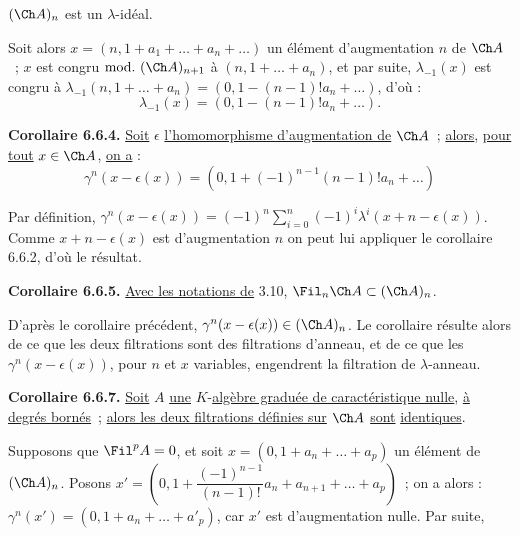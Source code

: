
\((\Ch A)_n\) est un \(\lambda\)-idéal.

Soit alors \(x=(n,1+a_1+\ldots+a_n+\ldots)\) un élément d'augmentation \(n\) de \(\Ch A\)~; \(x\) est congru \(\mathrm{mod.}\ (\Ch A)_{n+1}\) à \((n,1+\ldots+a_n)\), et par suite, \(\lambda_{-1}(x)\) est congru à \(\lambda_{-1}(n,1+\ldots+a_n)=(0,1-(n-1)!a_n+\ldots)\), d'où :
\[
  \lambda_{-1}(x)=(0,1-(n-1)!a_n+\ldots).
\]

\textbf{Corollaire 6.6.4.} \uline{Soit} \(\epsilon\) \uline{l'homomorphisme d'augmentation de} \(\Ch A\)~; \uline{alors}, \uline{pour tout} \(x\in\Ch A\), \uline{on a} :
\[
  \gamma^n(x-\epsilon(x))
  =
  (0,1+(-1)^{n-1}(n-1)!a_n+\ldots)
\]

Par définition, \(\gamma^n(x-\epsilon(x))=(-1)^n\sum_{i=0}^n(-1)^i\lambda^i(x+n-\epsilon(x))\). Comme \(x+n-\epsilon(x)\) est d'augmentation \(n\) on peut lui appliquer le corollaire 6.6.2, d'où le résultat.

\textbf{Corollaire 6.6.5.} \uline{Avec les notations de} 3.10, \(\Fil_n\Ch A\subset(\Ch A)_n\).

D'après le corollaire précédent, \(\gamma^n(x-\epsilon(x))\in(\Ch A)_n\). Le corollaire résulte alors de ce que les deux filtrations sont des filtrations d'anneau, et de ce que les \(\gamma^n(x-\epsilon(x))\), pour \(n\) et \(x\) variables, engendrent la filtration de \(\lambda\)-anneau.

\textbf{Corollaire 6.6.7.} \uline{Soit} \(A\) \uline{une} \(K\)-\uline{algèbre graduée de caractéristique nulle}, \uline{à degrés bornés}~; \uline{alors les deux filtrations définies sur} \(\Ch A\) \uline{sont} \uline{identiques}.

Supposons que \(\Fil^pA=0\), et soit \(x=(0,1+a_n+\ldots+a_p)\) un élément de \((\Ch A)_n\). Posons \(x'=\left(0,1+\dfrac{(-1)^{n-1}}{(n-1)!}a_n+a_{n+1}+\ldots+a_p\right)\)~; on a alors :
\(\gamma^n(x')=(0,1+a_n+\ldots+a'_p)\), car \(x'\) est d'augmentation nulle. Par suite, 
